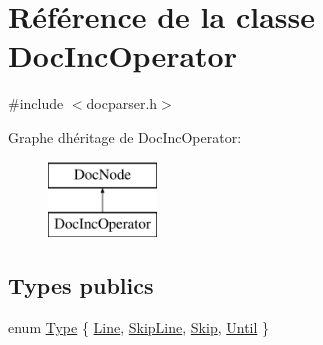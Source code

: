 \hypertarget{class_doc_inc_operator}{}\section{Référence de la classe Doc\+Inc\+Operator}
\label{class_doc_inc_operator}


{\ttfamily \#include $<$docparser.\+h$>$}

Graphe d\textquotesingle{}héritage de Doc\+Inc\+Operator\+:\begin{figure}[H]
\begin{center}
\leavevmode
\includegraphics[height=2.000000cm]{class_doc_inc_operator}
\end{center}
\end{figure}
\subsection*{Types publics}
\begin{DoxyCompactItemize}
\item 
enum \hyperlink{class_doc_inc_operator_ae7a155da5a206f51e93edc166bd64970}{Type} \{ \hyperlink{class_doc_inc_operator_ae7a155da5a206f51e93edc166bd64970a981a766f9067d8f850ef3c191433c2c0}{Line}, 
\hyperlink{class_doc_inc_operator_ae7a155da5a206f51e93edc166bd64970a2be537d3ba19e566040ed7b346beee19}{Skip\+Line}, 
\hyperlink{class_doc_inc_operator_ae7a155da5a206f51e93edc166bd64970a170db94965a90854526b0be5273d59b8}{Skip}, 
\hyperlink{class_doc_inc_operator_ae7a155da5a206f51e93edc166bd64970ae2a2f1290dfe2ddc9b5d24999cc153a9}{Until}
 \}
\end{DoxyCompactItemize}
